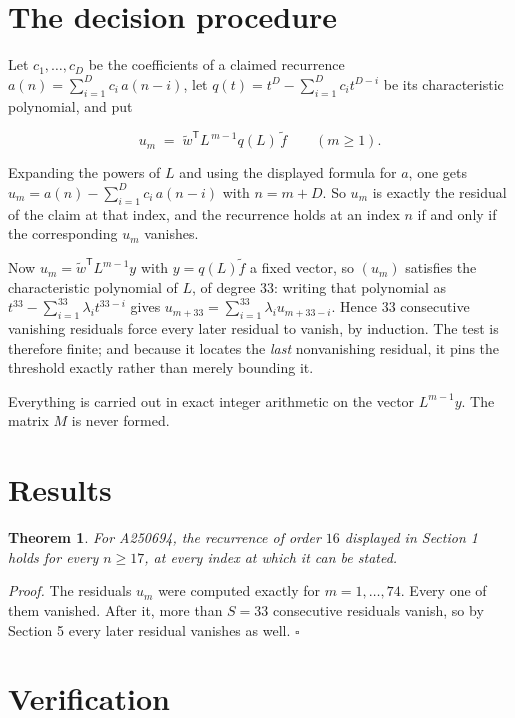 \documentclass[11pt]{article}
\newtheorem{theorem}{Theorem}
\theoremstyle{definition}
\begin{document}
\section{The decision procedure}

Let $c_1,\dots,c_D$ be the coefficients of a claimed recurrence $a(n) = \sum_{i=1}^{D} c_i\,a(n-i)$, let $q(t) = t^{D} - \sum_{i=1}^{D} c_i t^{D-i}$ be its characteristic polynomial, and put

\[u_m \;=\; \tilde w^{\mathsf T} L^{\,m-1} q(L)\,\tilde f \qquad (m \ge 1).\]

Expanding the powers of $L$ and using the displayed formula for $a$, one gets $u_m = a(n) - \sum_{i=1}^{D} c_i\,a(n-i)$ with $n = m + D$. So $u_m$ is exactly the residual of the claim at that index, and the recurrence holds at an index $n$ if and only if the corresponding $u_m$ vanishes.

Now $u_m = \tilde w^{\mathsf T} L^{m-1} y$ with $y = q(L)\tilde f$ a fixed vector, so $(u_m)$ satisfies the characteristic polynomial of $L$, of degree $33$: writing that polynomial as $t^{33} - \sum_{i=1}^{33} \lambda_i t^{33-i}$ gives $u_{m+33} = \sum_{i=1}^{33} \lambda_i u_{m+33-i}$. Hence $33$ consecutive vanishing residuals force every later residual to vanish, by induction. The test is therefore finite; and because it locates the {\itshape last} nonvanishing residual, it pins the threshold exactly rather than merely bounding it.

Everything is carried out in exact integer arithmetic on the vector $L^{m-1}y$. The matrix $M$ is never formed.

\section{Results}

\begin{theorem} For A250694, the recurrence of order $16$ displayed in Section 1 holds for every $n \ge 17$, at every index at which it can be stated.\end{theorem}

{\itshape Proof.} The residuals $u_m$ were computed exactly for $m = 1,\dots,74$. Every one of them vanished. After it, more than $S = 33$ consecutive residuals vanish, so by Section 5 every later residual vanishes as well. $\square$

\section{Verification}
\end{document}
